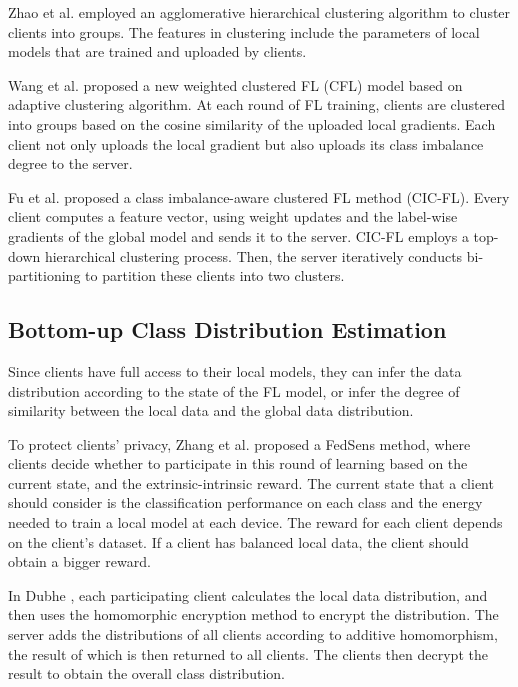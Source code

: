 \documentclass[10pt,journal,compsoc]{IEEEtran}
\begin{document}
Zhao et al. \cite{zhao2020cluster} employed an agglomerative hierarchical clustering algorithm to cluster clients into groups. The features in clustering include the parameters of local models that are trained and uploaded by clients. 

Wang et al. \cite{wang2021adaptive} proposed a new weighted clustered FL (CFL) model based on adaptive clustering algorithm. At each round of FL training, clients are clustered into groups based on the cosine similarity of the uploaded local gradients. Each client not only uploads the local gradient but also uploads its class imbalance degree to the server.  

Fu et al. \cite{fu2021cic} proposed a class imbalance-aware clustered FL method (CIC-FL). Every client computes a feature vector, using weight updates and the label-wise gradients of the global model and sends it to the server. CIC-FL employs a top-down hierarchical clustering process. Then, the server iteratively conducts bi-partitioning to partition these clients into two clusters. 
\vspace{-0.2cm}

\subsection{Bottom-up Class Distribution Estimation}
Since clients have full access to their local models, they can infer the data distribution according to the state of the FL model, or infer the degree of similarity between the local data and the global data distribution.

To protect clients' privacy, Zhang et al. \cite{zhang2021fedsens} proposed a FedSens method, where clients decide whether to participate in this round of learning based on the current state, and the extrinsic-intrinsic reward. The current state that a client should consider is the classification performance on each class and the energy needed to train a local model at each device. The reward for each client depends on the client's dataset. If a client has balanced local data, the client should obtain a bigger reward.

In Dubhe \cite{zhang2021dubhe}, each participating client calculates the local data distribution, and then uses the homomorphic encryption method to encrypt the distribution. The server adds the distributions of all clients according to additive homomorphism, the result of which is then returned to all clients. The clients then decrypt the result to obtain the overall class distribution. 
\end{document}
